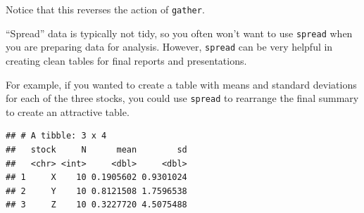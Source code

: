 \documentclass[]{book}
\makeatletter
\newenvironment{Shaded}{\begin{snugshade}}{\end{snugshade}}
\newcommand{\KeywordTok}[1]{\textcolor[rgb]{0.13,0.29,0.53}{\textbf{#1}}}
\newcommand{\DataTypeTok}[1]{\textcolor[rgb]{0.13,0.29,0.53}{#1}}
\newcommand{\DecValTok}[1]{\textcolor[rgb]{0.00,0.00,0.81}{#1}}
\newcommand{\StringTok}[1]{\textcolor[rgb]{0.31,0.60,0.02}{#1}}
\newcommand{\OperatorTok}[1]{\textcolor[rgb]{0.81,0.36,0.00}{\textbf{#1}}}
\newcommand{\NormalTok}[1]{#1}
\newenvironment{kframe}{%
\medskip{}
\setlength{\fboxsep}{.8em}
 \def\at@end@of@kframe{}%
 \ifinner\ifhmode%
  \def\at@end@of@kframe{\end{minipage}}%
  \begin{minipage}{\columnwidth}%
 \fi\fi%
 \def\FrameCommand##1{\hskip\@totalleftmargin \hskip-\fboxsep
 \colorbox{shadecolor}{##1}\hskip-\fboxsep
     \hskip-\linewidth \hskip-\@totalleftmargin \hskip\columnwidth}%
 \MakeFramed {\advance\hsize-\width
   \@totalleftmargin\z@ \linewidth\hsize
   \@setminipage}}%
 {\par\unskip\endMakeFramed%
 \at@end@of@kframe}
\renewenvironment{Shaded}{\begin{kframe}}{\end{kframe}}
\theoremstyle{definition}
\theoremstyle{definition}
\theoremstyle{definition}
\theoremstyle{remark}
\makeatother
\begin{document}
Notice that this reverses the action of \texttt{gather}.

``Spread'' data is typically not tidy, so you often won't want to use
\texttt{spread} when you are preparing data for analysis. However,
\texttt{spread} can be very helpful in creating clean tables for final
reports and presentations.

For example, if you wanted to create a table with means and standard
deviations for each of the three stocks, you could use \texttt{spread}
to rearrange the final summary to create an attractive table.

\begin{Shaded}
\end{Shaded}

\begin{verbatim}
## # A tibble: 3 x 4
##   stock     N      mean        sd
##   <chr> <int>     <dbl>     <dbl>
## 1     X    10 0.1905602 0.9301024
## 2     Y    10 0.8121508 1.7596538
## 3     Z    10 0.3227720 4.5075488
\end{verbatim}

\begin{Shaded}
\end{Shaded}
\end{document}
